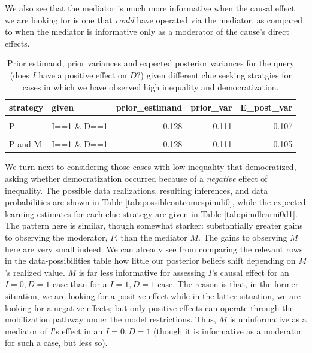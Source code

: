 \documentclass[
  12pt,
]{book}
\begin{document}
We also see that the mediator is much more informative when the causal effect we are looking for is one that \emph{could} have operated via the mediator, as compared to when the mediator is informative only as a moderator of the cause's direct effects.

\begin{table}

\caption{\label{tab:pimdlearni1d1} Prior estimand, prior variances and expected posterior variances for the query (does $I$ have a positive effect on $D$?) given different clue seeking  stratgies for cases in which we have observed high inequality and democratization.}
\centering
\begin{tabular}[t]{llrrr}
\toprule
strategy & given & prior\_estimand & prior\_var & E\_post\_var\\
\midrule
\cellcolor{gray!6}{None} & \cellcolor{gray!6}{I==1 \& D==1} & \cellcolor{gray!6}{0.128} & \cellcolor{gray!6}{0.111} & \cellcolor{gray!6}{0.111}\\
P & I==1 \& D==1 & 0.128 & 0.111 & 0.107\\
\cellcolor{gray!6}{M} & \cellcolor{gray!6}{I==1 \& D==1} & \cellcolor{gray!6}{0.128} & \cellcolor{gray!6}{0.111} & \cellcolor{gray!6}{0.109}\\
P and M & I==1 \& D==1 & 0.128 & 0.111 & 0.105\\
\bottomrule
\end{tabular}
\end{table}

We turn next to considering those cases with low inequality that democratized, asking whether democratization occurred because of a \emph{negative} effect of inequality. The possible data realizations, resulting inferences, and data probabilities are shown in Table \ref{tab:possibleoutcomespimdi0}, while the expected learning estimates for each clue strategy are given in Table \ref{tab:pimdlearni0d1}. The pattern here is similar, though somewhat starker: substantially greater gains to observing the moderator, \(P\), than the mediator \(M\). The gains to observing \(M\) here are very small indeed. We can already see from comparing the relevant rows in the data-possibilities table how little our posterior beliefs shift depending on \(M\)'s realized value. \(M\) is far less informative for assessing \(I\)'s causal effect for an \(I=0, D=1\) case than for a \(I=1, D=1\) case. The reason is that, in the former situation, we are looking for a positive effect while in the latter situation, we are looking for a negative effects; but only positive effects can operate through the mobilization pathway under the model restrictions. Thus, \(M\) is uninformative as a mediator of \(I\)'s effect in an \(I=0, D=1\) (though it is informative as a moderator for such a case, but less so).
\end{document}
